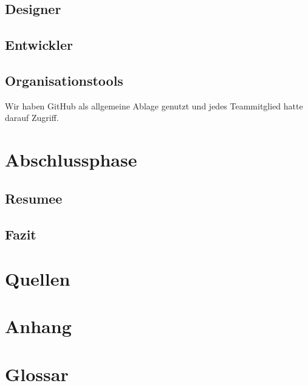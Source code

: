 \documentclass[12pt,a4paper]{article}
\begin{document}
\subsection{Designer}
\subsection{Entwickler}
\subsection{Organisationstools}
Wir haben GitHub als allgemeine Ablage genutzt und jedes Teammitglied hatte darauf Zugriff.


\newpage
\section{Abschlussphase}
\subsection{Resumee}
\subsection{Fazit}
\newpage
\section*{Quellen}
\newpage
\section*{Anhang}
\newpage
\section*{Glossar}
\end{document}
